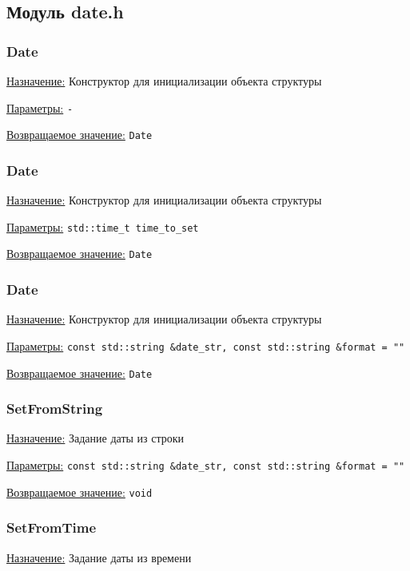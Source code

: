 \subsection{Модуль date.h}


\subsubsection{Date}

\underline{Назначение:} Конструктор для инициализации объекта структуры

\underline{Параметры:} \verb|-|

\underline{Возвращаемое значение:} \verb|Date|


\subsubsection{Date}

\underline{Назначение:} Конструктор для инициализации объекта структуры

\underline{Параметры:} \verb|std::time_t time_to_set|

\underline{Возвращаемое значение:} \verb|Date|


\subsubsection{Date}

\underline{Назначение:} Конструктор для инициализации объекта структуры

\underline{Параметры:} \verb|const std::string &date_str, const std::string &format = ""|

\underline{Возвращаемое значение:} \verb|Date|


\subsubsection{SetFromString}

\underline{Назначение:} Задание даты из строки

\underline{Параметры:} \verb|const std::string &date_str, const std::string &format = ""|

\underline{Возвращаемое значение:} \verb|void|


\subsubsection{SetFromTime}

\underline{Назначение:} Задание даты из времени

